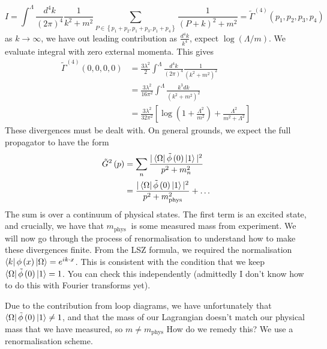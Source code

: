 \documentclass[11pt, oneside]{article}   	%
\theoremstyle{slanted}
\begin{document}
\[
I  = \int ^ \Lambda \frac{ d^ 4 k }{ \left( 2 \pi  \right)  ^ 4 } 
\frac{1}{k ^ 2 + m ^ 2  } \sum _{ 
P \in \left\{  p_1 + p_2 , p_1 + p_3 , p_1 + p_4  \right\}  } 
\frac{1}{\left( P + k  \right)  ^ 2 + m ^ 2 }  = \tilde{ \Gamma } 
^{ \left( 4  \right)  } \left( p_1 , p_2, p_3, p_4 \right) 
\] as $ k \to \infty $, we have 
out leading contribution as $ \frac{d ^ 4 k }{ k ^ 4 } $, 
expect $ \log \left( \Lambda  / m    \right)  $. 
We evaluate integral with zero external momenta. 
This gives 
\begin{align*}
\tilde{ \Gamma } ^{ \left( 4  \right)  } 
\left( 0 , 0 , 0 , 0  \right)  & = 
\frac{3 \lambda ^ 2 }{ 2  } \int ^ \Lambda \frac{d ^ 4 k }{ \left( 
2 \pi \right)  ^ 4 } \frac{1}{\left( k ^ 2 + m ^ 2  \right)  ^ 2 } \\
&=  \frac{ 3 \lambda ^ 2 }{ 16 \pi ^ 2 } \int ^ \Lambda \frac{k ^ 3 dk }{ 
\left( k ^ 2 + m ^ 2  \right)  ^ 2 }   \\ 
&=  \frac{ 3 \lambda ^ 2 }{ 32 \pi ^ 2 } \left[  
\log \left( 1 + \frac{\Lambda ^ 2 }{ m ^ 2 }  \right)  + \frac{\Lambda^ 2 }{ m ^ 2 + \Lambda ^ 2 }\right]  
\end{align*}
These divergences 
must be dealt with. On general grounds, 
we expect the full propagator to 
have the form
\begin{align*}
\tilde{ G } ^ 2 \left( p  \right)  &=  \sum _ n \frac{
| \bra{\Omega  } \tilde{ \phi } \left( 0  \right)  \ket{1 } |^ 2  }{
p ^ 2 + m _{ n } ^ 2 } \\ 
&=  \frac{| \bra{\Omega  } \tilde{ \phi } \left( 0 \right)  \ket{1} | ^ 2  }{
p ^ 2 + m _{\text{phys}}^ 2 }  + \dots\\
\end{align*}
The sum is over a continuum of physical 
states. The first term 
is an excited state, and crucially, we have that 
$ m _{\text{phys } } $ is some measured 
mass from experiment. 
We will now go through the process of renormalisation 
to understand how to make these divergences 
finite. From the LSZ formula, we 
required the normalisation $ \bra{ k } \phi \left( x   \right)  \ket{ \Omega }  =
e ^{ i k \cdot  x } $. This is consistent with the condition 
that we 
keep $ \bra{ \Omega } \tilde{ \phi } \left( 0  \right)  \ket{ 1 }  =1   $. 
You can check this independently (admittedly I don't
know how to do this with Fourier transforms yet). 

Due to the contribution from 
loop diagrams, we have unfortunately that 
$ \bra{ \Omega} \tilde{ \phi } \left( 0  \right) \ket{1} \neq 1 $, 
and that the mass of our Lagrangian 
doesn't match our physical mass that 
we have measured, so $ m \neq m _{ \text{phys}}$ 
How do we remedy this? We use a renormalisation scheme. 
\end{document}
